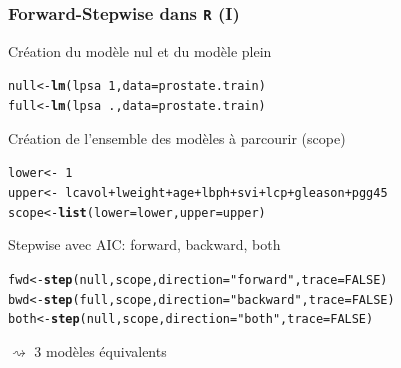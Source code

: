 \documentclass{beamer}\usepackage[]{graphicx}\usepackage[]{color}
\makeatletter
\newcommand{\hlnum}[1]{\textcolor[rgb]{0.686,0.059,0.569}{#1}}%
\newcommand{\hlstr}[1]{\textcolor[rgb]{0.192,0.494,0.8}{#1}}%
\newcommand{\hlopt}[1]{\textcolor[rgb]{0,0,0}{#1}}%
\newcommand{\hlstd}[1]{\textcolor[rgb]{0.345,0.345,0.345}{#1}}%
\newcommand{\hlkwb}[1]{\textcolor[rgb]{0.69,0.353,0.396}{#1}}%
\newcommand{\hlkwc}[1]{\textcolor[rgb]{0.333,0.667,0.333}{#1}}%
\newcommand{\hlkwd}[1]{\textcolor[rgb]{0.737,0.353,0.396}{\textbf{#1}}}%
\newenvironment{kframe}{%
 \def\at@end@of@kframe{}%
 \ifinner\ifhmode%
  \def\at@end@of@kframe{\end{minipage}}%
  \begin{minipage}{\columnwidth}%
 \fi\fi%
 \def\FrameCommand##1{\hskip\@totalleftmargin \hskip-\fboxsep
 \colorbox{shadecolor}{##1}\hskip-\fboxsep
     \hskip-\linewidth \hskip-\@totalleftmargin \hskip\columnwidth}%
 \MakeFramed {\advance\hsize-\width
   \@totalleftmargin\z@ \linewidth\hsize
   \@setminipage}}%
 {\par\unskip\endMakeFramed%
 \at@end@of@kframe}
\newenvironment{knitrout}{}{} %
\makeatother
\begin{document}
\begin{frame}[containsverbatim]
  \frametitle{Forward-Stepwise dans \texttt{R} (I)}

Création du modèle nul et du modèle plein
\begin{knitrout}\scriptsize
{}\color{fgcolor}\begin{kframe}
\begin{alltt}
\hlstd{null}  \hlkwb{<-} \hlkwd{lm}\hlstd{(lpsa} \hlopt{~} \hlnum{1}\hlstd{,} \hlkwc{data}\hlstd{=prostate.train)}
\hlstd{full}  \hlkwb{<-} \hlkwd{lm}\hlstd{(lpsa} \hlopt{~} \hlstd{.,} \hlkwc{data}\hlstd{=prostate.train)}
\end{alltt}
\end{kframe}
\end{knitrout}

Création de l'ensemble des modèles à parcourir (\og scope\fg)
\begin{knitrout}\scriptsize
{}\color{fgcolor}\begin{kframe}
\begin{alltt}
\hlstd{lower} \hlkwb{<-} \hlopt{~}\hlnum{1}
\hlstd{upper} \hlkwb{<-} \hlopt{~}\hlstd{lcavol}\hlopt{+}\hlstd{lweight}\hlopt{+}\hlstd{age}\hlopt{+}\hlstd{lbph}\hlopt{+}\hlstd{svi}\hlopt{+}\hlstd{lcp}\hlopt{+}\hlstd{gleason}\hlopt{+}\hlstd{pgg45}
\hlstd{scope} \hlkwb{<-} \hlkwd{list}\hlstd{(}\hlkwc{lower}\hlstd{=lower,}\hlkwc{upper}\hlstd{=upper)}
\end{alltt}
\end{kframe}
\end{knitrout}

Stepwise avec AIC: forward, backward, both
\begin{knitrout}\scriptsize
{}\color{fgcolor}\begin{kframe}
\begin{alltt}
\hlstd{fwd}  \hlkwb{<-} \hlkwd{step}\hlstd{(null, scope,} \hlkwc{direction}\hlstd{=}\hlstr{"forward"} \hlstd{,} \hlkwc{trace}\hlstd{=}\hlnum{FALSE}\hlstd{)}
\hlstd{bwd}  \hlkwb{<-} \hlkwd{step}\hlstd{(full, scope,} \hlkwc{direction}\hlstd{=}\hlstr{"backward"}\hlstd{,} \hlkwc{trace}\hlstd{=}\hlnum{FALSE}\hlstd{)}
\hlstd{both} \hlkwb{<-} \hlkwd{step}\hlstd{(null, scope,} \hlkwc{direction}\hlstd{=}\hlstr{"both"}   \hlstd{,} \hlkwc{trace}\hlstd{=}\hlnum{FALSE}\hlstd{)}
\end{alltt}
\end{kframe}
\end{knitrout}

\vfill

$\rightsquigarrow$ 3  modèles équivalents
\end{frame}
\end{document}
